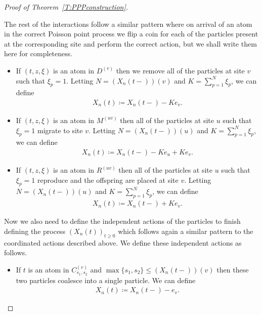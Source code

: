 \documentclass[11pt]{article}
\theoremstyle{definition}
\newcommand{\thmref}[1]{Theorem~\ref{T:#1}}
\begin{document}
\begin{proof}[Proof of \thmref{PPPconstruction}]
\begin{itemize}
    \end{itemize}

    \noindent The rest of the interactions follow a similar pattern where on arrival of an atom in the correct Poisson point process we flip a coin for each of the particles present at the corresponding site and perform the correct action, but we shall write them here for completeness.
    
    \begin{itemize}

        \item If $(t, z, \xi)$ is an atom in $D^{(v)}$ then we remove all of the particles at site $v$ such that $\xi_p = 1$. Letting $N = (X_n(t-))(v)$ and $K = \sum_{p = 1}^N \xi_p$, we can define
        \begin{align*}
            X_n(t) \coloneqq X_n(t-) - Ke_v.
        \end{align*}

        \item If $(t, z, \xi)$ is an atom in $M^{(uv)}$ then all of the particles at site $u$ such that $\xi_p = 1$ migrate to site $v$. Letting $N = (X_n(t-))(u)$ and $K = \sum_{p = 1}^N \xi_p$, we can define
        \begin{align*}
             X_n(t) \coloneqq X_n(t-) - Ke_u + Ke_v.
        \end{align*}

        \item If $(t, z, \xi)$ is an atom in $R^{(uv)}$ then all of the particles at site $u$ such that $\xi_p = 1$ reproduce and the offspring are placed at site $v$. Letting $N = (X_n(t-))(u)$ and $K = \sum_{p = 1}^N \xi_p$, we can define
        \begin{align*}
            X_n(t) \coloneqq X_n(t-)+ Ke_v.
        \end{align*}
    \end{itemize}

    \noindent Now we also need to define the independent actions of the particles to finish defining the process $(X_n(t))_{t \geq 0}$ which follows again a similar pattern to the coordinated actions described above. We define these independent actions as follows.

    \begin{itemize}
        \item If $t$ is an atom in $C^{(v)}_{s_1,s_2}$ and $\max\{s_1,s_2\} \leq (X_n(t-))(v)$ then these two particles coalesce into a single particle. We can define
        \begin{align*}
            X_n(t) \coloneqq X_n(t-) - e_v.
        \end{align*}


\end{itemize}
\end{proof}
\end{document}
